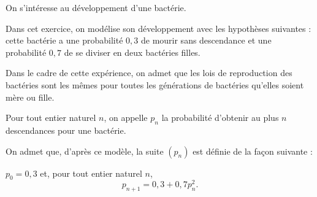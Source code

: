 On s'intéresse au développement d'une bactérie.

Dans cet exercice, on modélise son développement avec les hypothèses suivantes : cette bactérie a une probabilité $0,3$ de mourir sans descendance et une probabilité $0,7$ de se diviser en deux bactéries filles.

Dans le cadre de cette expérience, on admet que les lois de reproduction des bactéries sont les mêmes pour toutes les générations de bactéries qu'elles soient mère ou fille.

Pour tout entier naturel $n$, on appelle $p_n$ la probabilité d'obtenir au plus $n$ descendances pour une bactérie. 

On admet que, d'après ce modèle, la suite $\left(p_n\right)$ est définie de la façon suivante :

$p_0 = 0,3$ et, pour tout entier naturel $n$, \[p_{n+1} = 0,3 + 0,7p_n^2.\]
%

